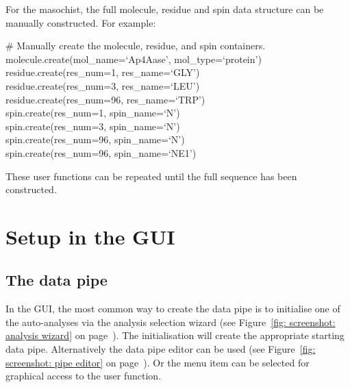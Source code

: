 For the masochist, the full molecule, residue and spin data structure can be manually constructed.  For example:

\begin{exampleenv}
\# Manually create the molecule, residue, and spin containers. \\
molecule.create(mol\_name=`Ap4Aase', mol\_type=`protein') \\
residue.create(res\_num=1,  res\_name=`GLY') \\
residue.create(res\_num=3,  res\_name=`LEU') \\
residue.create(res\_num=96, res\_name=`TRP') \\
spin.create(res\_num=1,  spin\_name=`N') \\
spin.create(res\_num=3,  spin\_name=`N') \\
spin.create(res\_num=96, spin\_name=`N') \\
spin.create(res\_num=96, spin\_name=`NE1')
\end{exampleenv}

These user functions can be repeated until the full sequence has been constructed.




\section{Setup in the GUI}



\subsection{The data pipe} \label{sect: GUI - data pipe}

In the GUI, the most common way to create the data pipe is to initialise one of the auto-analyses via the analysis selection wizard (see Figure~\ref{fig: screenshot: analysis wizard} on page~\pageref{fig: screenshot: analysis wizard}).  The initialisation will create the appropriate starting data pipe.  Alternatively the data pipe editor can be used (see Figure~\ref{fig: screenshot: pipe editor} on page~\pageref{fig: screenshot: pipe editor}).  Or the  menu item can be selected for graphical access to the  user function.




